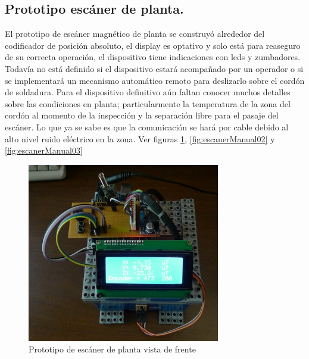 \subsection{Prototipo escáner de planta.}

El prototipo de escáner magnético de planta se construyó alrededor del codificador de posición absoluto, el display es optativo y solo está para reaseguro de su correcta operación, el dispositivo tiene indicaciones con leds y zumbadores. Todavía no está definido si el dispositivo estará acompañado por un operador o si se implementará un mecanismo automático remoto para deslizarlo sobre el cordón de soldadura. Para el dispositivo definitivo aún faltan conocer muchos detalles sobre las condiciones en planta; particularmente la temperatura de la zona del cordón al momento de la inspección y la separación libre para el pasaje del escáner. Lo que ya se sabe es que la comunicación se hará por cable debido al alto nivel ruido eléctrico en la zona. Ver figuras \ref{fig:escanerManual01}, \ref{fig:escanerManual02} y \ref{fig:escanerManual03} 

\begin{figure}[H]
    \centering
    \includegraphics[width=0.75\textwidth]{./Figures/escanerManual01}
	\caption{Prototipo de escáner de planta vista de frente}
	\label{fig:escanerManual01}
 \end{figure}

